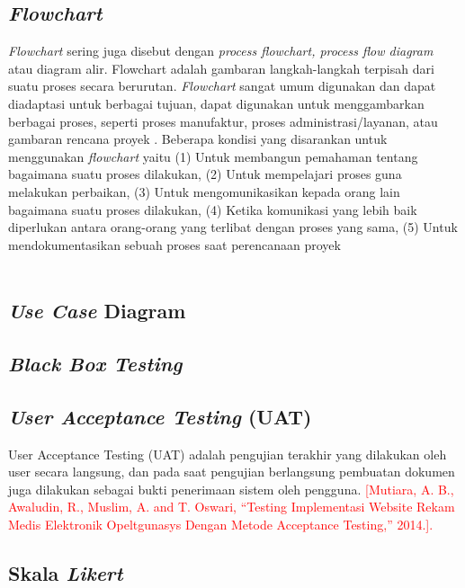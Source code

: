 \begin{flushleft}
\begin{justify}
        \subsection{\textit{Flowchart}}
        \textit{Flowchart} sering juga disebut dengan \textit{process flowchart, process flow diagram} atau diagram alir. Flowchart adalah gambaran langkah-langkah terpisah dari suatu proses secara berurutan. 
        \textit{Flowchart} sangat umum digunakan dan dapat diadaptasi untuk berbagai tujuan, dapat digunakan untuk menggambarkan berbagai proses, seperti proses manufaktur, proses administrasi/layanan, atau gambaran rencana proyek \cite{Flowchart}.
        Beberapa kondisi yang disarankan untuk menggunakan \textit{flowchart} yaitu 
        (1) Untuk membangun pemahaman tentang bagaimana suatu proses dilakukan,
        (2) Untuk mempelajari proses guna melakukan perbaikan,
        (3) Untuk mengomunikasikan kepada orang lain bagaimana suatu proses dilakukan,
        (4) Ketika komunikasi yang lebih baik diperlukan antara orang-orang yang terlibat dengan proses yang sama,
        (5) Untuk mendokumentasikan sebuah proses saat perencanaan proyek
        \\\\

        \subsection{\textit{Use Case} Diagram}

        \subsection{\textit{Black Box Testing}}

        \subsection{\textit{User Acceptance Testing} (UAT)}
        \noindent User Acceptance Testing (UAT) adalah pengujian terakhir yang dilakukan oleh user secara langsung, dan pada saat pengujian berlangsung pembuatan dokumen juga dilakukan sebagai bukti penerimaan sistem oleh pengguna. 
        \textcolor{red}{[Mutiara, A. B., Awaludin, R., Muslim, A. and T. Oswari, “Testing Implementasi Website Rekam Medis Elektronik Opeltgunasys Dengan Metode Acceptance Testing,” 2014.].
        }
        

        \subsection{Skala \textit{Likert}}






    \end{justify}
    



\end{flushleft}



\newpage